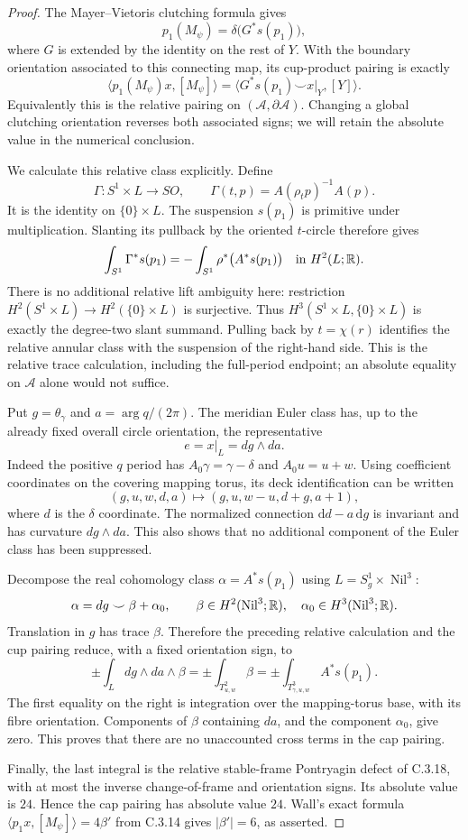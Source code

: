 \begin{proof}
The Mayer--Vietoris clutching formula gives
\[
 p_1(M_\psi)=\delta\bigl(G^*s(p_1)\bigr),
\]
where $G$ is extended by the identity on the rest of $Y$.
With the boundary orientation associated to this connecting
map, its cup-product pairing is exactly
\[
 \langle p_1(M_\psi)x,[M_\psi]\rangle
 =\langle G^*s(p_1)\smile x|_Y,[Y]\rangle.
\]
Equivalently this is the relative pairing on
$(\mathcal A,\partial\mathcal A)$. Changing a global
clutching orientation reverses both associated signs;
we will retain the absolute value in the numerical conclusion.

We calculate this relative class explicitly. Define
\[
 \Gamma:S^1\times L\longrightarrow SO,
 \qquad\Gamma(t,p)=A(\rho_t p)^{-1}A(p).
\]
It is the identity on $\{0\}\times L$. The suspension
$s(p_1)$ is primitive under multiplication. Slanting its
pullback by the oriented $t$-circle therefore gives
\[
 \int_{S^1}\Gamma^*s(p_1)
 =-\int_{S^1}\rho^*\bigl(A^*s(p_1)\bigr)
 \quad\hbox{in }H^2(L;\mathbb R).
\]
There is no additional relative lift ambiguity here:
restriction $H^2(S^1\times L)\to H^2(\{0\}\times L)$
is surjective. Thus $H^3(S^1\times L,\{0\}\times L)$
is exactly the degree-two slant summand. Pulling back by
$t=\chi(r)$ identifies the relative annular class with
the suspension of the right-hand side. This is the
relative trace calculation, including the full-period
endpoint; an absolute equality on $\mathcal A$ alone
would not suffice.

Put $g=\theta_\gamma$ and $a=\arg q/(2\pi)$. The meridian
Euler class has, up to the already fixed overall circle
orientation, the representative
\[
 e=x|_L=dg\wedge da.
\]
Indeed the positive $q$ period has
$A_0\gamma=\gamma-\delta$ and $A_0u=u+w$.
Using coefficient coordinates on the covering mapping
torus, its deck identification can be written
\[
 (g,u,w,d,a)\longmapsto(g,u,w-u,d+g,a+1),
\]
where $d$ is the $\delta$ coordinate. The normalized
connection $\mathrm d d-a\,\mathrm d g$ is invariant and has curvature
$dg\wedge da$. This also shows that no additional
component of the Euler class has been suppressed.

Decompose the real cohomology class
$\alpha=A^*s(p_1)$ using $L=S^1_g\times\operatorname{Nil}^3$:
\[
 \alpha=dg\smile\beta+\alpha_0,
 \qquad\beta\in H^2(\operatorname{Nil}^3;\mathbb R),\quad
 \alpha_0\in H^3(\operatorname{Nil}^3;\mathbb R).
\]
Translation in $g$ has trace $\beta$. Therefore the preceding
relative calculation and the cup pairing reduce, with a
fixed orientation sign, to
\[
 \pm\int_L dg\wedge da\wedge\beta
 =\pm\int_{T^2_{u,w}}\beta
 =\pm\int_{T^3_{\gamma,u,w}}A^*s(p_1).
\]
The first equality on the right is integration over the
mapping-torus base, with its fibre orientation. Components
of $\beta$ containing $da$, and the component $\alpha_0$,
give zero. This proves that there are no unaccounted
cross terms in the cap pairing.

Finally, the last integral is the relative stable-frame
Pontryagin defect of C.3.18, with at most the inverse
change-of-frame and orientation signs. Its absolute value
is $24$. Hence the cap pairing has absolute value $24$.
Wall's exact formula $\langle p_1x,[M_\psi]\rangle=4\beta'$
from C.3.14 gives $|\beta'|=6$, as asserted.
\end{proof}

